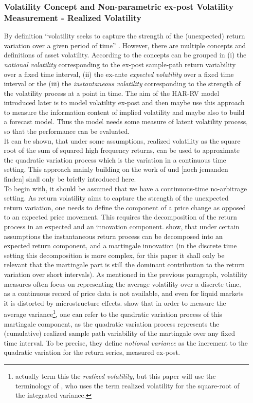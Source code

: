 \subsubsection{Volatility Concept and Non-parametric ex-post Volatility Measurement - Realized Volatility}
By definition ``volatility seeks to capture the strength of the (unexpected) return variation over a given period of time'' \parencite[p.7]{andersen2001}. However, there are multiple concepts and definitions of asset volatility. According to \citeauthor{andersen2001} the concepts can be grouped in (i) the \emph{notional volatility} corresponding to the ex-post sample-path return variability over a fixed time interval, (ii) the ex-ante \emph{expected volatility} over a fixed time interval or the (iii) the \emph{instantaneous volatility} corresponding to the strength of the volatility process at a point in time.
The aim of the HAR-RV model introduced later is to model volatility ex-post and then maybe use this approach to measure the information content of implied volatility and maybe also to build a forecast model. Thus the model needs some measure of latent volatility process, so that the performance can be evaluated. \\
It can be shown, that under some assumptions, realized volatility as the square root of the sum of squared high frequency returns, can be used to approximate the quadratic variation process which is the variation in a continuous time setting. This approach mainly building on the work of \citeauthor{andersen2001} und [noch jemanden finden] shall only be briefly introduced here. \\
To begin with, it should be assumed that we have a continuous-time no-arbitrage setting. As return volatility aims to capture the strength of the unexpected return variation, one needs to define the component of a price change as opposed to an expected price movement. This requires the decomposition of the return process in an expected and an innovation component. \citeauthor{andersen2001} show, that under certain assumptions the instantaneous return process can be decomposed into an expected return component, and a martingale innovation (in the discrete time setting this decomposition is more complex, for this paper it shall only be relevant that the martingale part is still the dominant contribution to the return variation over short intervals). As mentioned in the previous paragraph, volatility measures often focus on representing the average volatility over a discrete time, as a continuous record of price data is not available, and even for liquid markets it is distorted by microstructure effects. \textcite{andersen2001} show that in order to measure the average variance\footnote{actually \textcite{andersen2001} term this the \emph{realized volatility}, but this paper will use the terminology of \textcite{corsi2009}, who uses the term realized volatility for the square-root of the integrated variance.}, one can refer to the quadratic variation process of this martingale component, as the quadratic variation process represents the (cumulative) realized sample path variability of the martingale over any fixed time interval. To be precise, they define \emph{notional variance} as the increment to the quadratic variation for the return series, measured ex-post. \\
